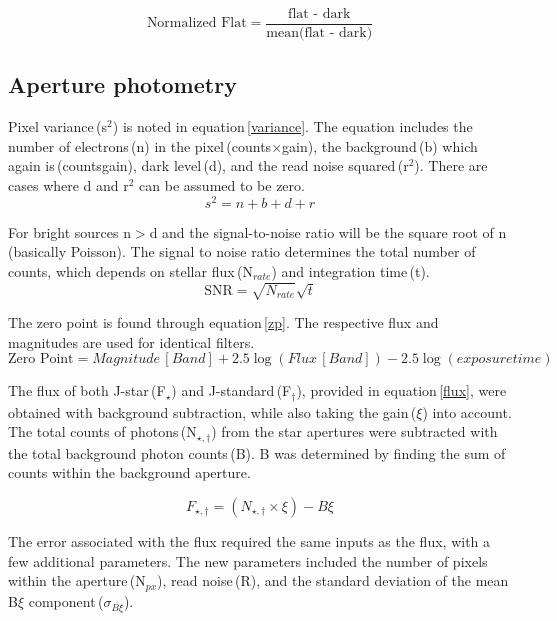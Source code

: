 \documentclass[onecolumn]{aastex6}
\begin{document}
\begin{equation}
\text{Normalized Flat} = \frac{\text{flat - dark}}{\text{mean(flat - dark)}}
\label{normflats}
\end{equation}

\subsection{Aperture photometry}

Pixel variance\,(s$^2$) is noted in equation\,\ref{variance}. The equation includes the number of electrons\,(n) in the pixel\,(counts$\times$gain), the background\,(b) which again is\,(counts\*gain), dark level\,(d), and the read noise squared\,(r$^2$). There are cases where d and r$^2$ can be assumed to be zero.
\begin{equation}
s^2 = n+b+d+r
\label{variance}
\end{equation}

For bright sources n$>$d and the signal-to-noise ratio will be the square root of n\,(basically Poisson). The signal to noise ratio determines the total number of counts, which depends on stellar flux\,(N$_{rate}$) and integration time\,(t). 
\begin{equation}
\text{SNR} = \sqrt{N_{rate}}\sqrt{t}
\label{snr}
\end{equation}


The zero point is found through equation\,\ref{zp}. The respective flux and magnitudes are used for identical filters.
\begin{equation}
\text{Zero Point} = Magnitude\,[Band] + 2.5\log(Flux\,[Band]) - 2.5\log(exposure time)
\label{zp}
\end{equation}

\indent The flux of both J-star\,(F$_{\star}$) and J-standard\,(F$_{\dagger}$), provided in equation\,\ref{flux}, were obtained with background subtraction, while also taking the gain\,($\xi$) into account. The total counts of photons\,(N$_{\star,\dagger}$) from the star apertures were subtracted with the total background photon counts\,(B). B was determined by finding the sum of counts within the background aperture.

\begin{equation}
F_{\star,\dagger} = (N_{\star,\dagger}\times \xi) - B\xi
\label{flux}
\end{equation}

The error associated with the flux required the same inputs as the flux, with a few additional parameters. The new parameters included the number of pixels within the aperture\,(N$_{px}$), read noise\,(R), and the standard deviation of the mean B$\xi$ component\,($\sigma_{\overline{B\xi}}$).
\end{document}

